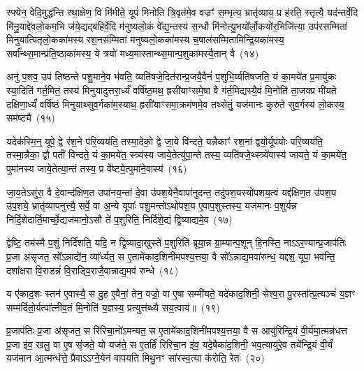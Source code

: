 स्फ्येन॒ वेदि॒मुद्ध॑न्ति रथा॒क्षेण॒ वि मि॑मीते॒ यूपं॑ मिनोति त्रि॒वृत॑मे॒व वज्रꣳ॑ स॒म्भृत्य॒ भ्रातृ॑व्याय॒ प्र ह॑रति॒ स्तृत्यै॒ यद॑न्तर्वे॒दि मि॑नु॒याद्दे॑वलो॒कम॒भि ज॑ये॒द्यद्ब॑हिर्वे॒दि म॑नुष्यलो॒कं वे᳚द्य॒न्तस्य॑ स॒न्धौ मि॑नोत्यु॒भयो᳚र्लो॒कयो॑र॒भिजि॑त्या॒ उप॑रसम्मितां मिनुयात्पितृलो॒कका॑मस्य रश॒नस॑म्मितां मनुष्यलो॒कका॑मस्य च॒षाल॑सम्मितामिन्द्रि॒यका॑मस्य॒ सर्वा᳚न्थ्स॒मान्प्र॑ति॒ष्ठाका॑मस्य॒ ये त्रयो॑ मध्य॒मास्तान्थ्स॒मान्प॒शुका॑मस्यै॒तान् वै~(१४)\ip

अनु॑ प॒शव॒ उप॑ तिष्ठन्ते पशु॒माने॒व भ॑वति॒ व्यति॑षजे॒दित॑रान्प्र॒जयै॒वैनं॑ प॒शुभि॒र्व्यति॑षजति॒ यं का॒मये॑त प्र॒मायु॑कः स्या॒दिति॑ गर्त॒मितं॒ तस्य॑ मिनुयादुत्तरा॒र्ध्यं॑ वर्\mbox{}षि॑ष्ठ॒मथ॒ ह्रसी॑याꣳसमे॒षा वै ग॑र्त॒मिद्यस्यै॒वं मि॒नोति॑ ता॒जक्प्र मी॑यते दक्षिणा॒र्ध्यं॑ वर्\mbox{}षि॑ष्ठं मिनुयाथ्सुव॒र्गका॑म॒स्याथ॒ ह्रसी॑याꣳसमा॒क्रम॑णमे॒व तथ्सेतुं॒ यज॑मानः कुरुते सुव॒र्गस्य॑ लो॒कस्य॒ सम॑ष्ट्यै~(१५)\ip

यदेक॑स्मि॒न्॒ यूपे॒ द्वे र॑श॒ने प॑रि॒व्यय॑ति॒ तस्मा॒देको॒ द्वे जा॒ये वि॑न्दते॒ यन्नैकाꣳ॑ रश॒नां द्वयो॒र्यूप॑योः परि॒व्यय॑ति॒ तस्मा॒न्नैका॒ द्वौ पती॑ विन्दते॒ यं का॒मये॑त॒ स्त्र्य॑स्य जाये॒तेत्यु॑पा॒न्ते तस्य॒ व्यति॑षजे॒थ्स्त्र्ये॑वास्य॑ जायते॒ यं का॒मये॑त॒ पुमा॑नस्य जाये॒तेत्या॒न्तं तस्य॒ प्र वे᳚ष्टये॒त्पुमा॑ने॒वास्य॑~(१६)\ip

जा॒य॒ते\-ऽसु॑रा॒ वै दे॒वान्द॑क्षिण॒त उपा॑नय॒न्तां दे॒वा उ॑पश॒येनै॒वापा॑नुदन्त॒ तदु॑पश॒यस्यो॑पशय॒त्वं यद्द॑क्षिण॒त उ॑पश॒य उ॑प॒शये॒ भ्रातृ॑व्यापनुत्त्यै॒ सर्वे॒ वा अ॒न्ये यूपाः᳚ पशु॒मन्तो\-ऽथो॑पश॒य ए॒वाप॒शुस्तस्य॒ यज॑मानः प॒शुर्यन्न नि॑र्दि॒शेदार्ति॒\-मार्च्छे॒द्यज॑मानो॒\-ऽसौ ते॑ प॒शुरिति॒ निर्दि॑शे॒द्यं द्वि॒ष्याद्यमे॒व~(१७)\ip

द्वेष्टि॒ तम॑स्मै प॒शुं निर्दि॑शति॒ यदि॒ न द्वि॒ष्यादा॒खुस्ते॑ प॒शुरिति॑ ब्रूया॒न्न ग्रा॒म्यान्प॒शून् हि॒नस्ति॒ ना\-ऽऽर॒ण्यान्प्र॒जा\-प॑तिः प्र॒जा अ॑सृजत॒ सो᳚\-ऽन्नाद्ये॑न॒ व्या᳚र्ध्यत॒ स ए॒तामे॑काद॒शिनी॑मपश्य॒त्तया॒ वै सो᳚\-ऽन्नाद्य॒मवा॑रुन्ध॒ यद्दश॒ यूपा॒ भव॑न्ति॒ दशा᳚क्षरा वि॒राडन्नं॑ वि॒राड्वि॒राजै॒वान्नाद्य॒मव॑ रुन्धे~(१८)\ip

य ए॑काद॒शः स्तन॑ ए॒वास्यै॒ स दु॒ह ए॒वैनां॒ तेन॒ वज्रो॒ वा ए॒षा सम्मी॑यते॒ यदे॑काद॒शिनी॒ सेश्व॒रा पु॒रस्ता᳚त्प्र॒त्यञ्चं॑ य॒ज्ञꣳ सम्म॑र्दितो॒र्यत्पा᳚त्नीव॒तं मि॒नोति॑ य॒ज्ञस्य॒ प्रत्युत्त॑ब्ध्यै सय॒त्वाय॑॥~(१९)\ip

{\anuvakamend[{वै सम॑ष्ट्यै॒ पुमा॑ने॒वास्य॒ यमे॒व रु॑न्धे त्रि॒ꣳ॒शच्च॑}]}

प्र॒जा\-प॑तिः प्र॒जा अ॑सृजत॒ स रि॑रिचा॒नो॑\-ऽमन्यत॒ स ए॒तामे॑काद॒शिनी॑मपश्य॒त्तया॒ वै स आयु॑रिन्द्रि॒यं वी॒र्य॑मा॒त्मन्न॑धत्त प्र॒जा इ॑व॒ खलु॒ वा ए॒ष सृ॑जते॒ यो यज॑ते॒ स ए॒तर्\mbox{}हि॑ रिरिचा॒न इ॑व॒ यदे॒षैका॑द॒शिनी॒ भव॒त्यायु॑रे॒व तये᳚न्द्रि॒यं वी॒र्यं॑ यज॑मान आ॒त्मन्ध॑त्ते॒ प्रैवा\-ऽऽ\-ग्ने॒येन॑ वापयति मिथु॒नꣳ सा॑रस्व॒त्या क॑रोति॒ रेतः॑~(२०)\ip

